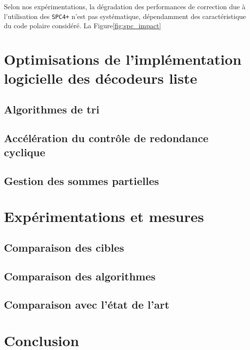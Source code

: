 Selon nos expérimentations, la dégradation des performances de correction due à l'utilisation des \noeuds \texttt{SPC4+} n'est pas systématique, dépendamment des caractéristique du code polaire considéré. La Figure\ref{fig:spc_impact}


\section{Optimisations de l'implémentation logicielle des décodeurs liste}
\label{sec:opti_scl}

\subsection{Algorithmes de tri}
\subsection{Accélération du contrôle de redondance cyclique}
\subsection{Gestion des sommes partielles}

\section{Expérimentations et mesures}
\label{sec:exp_scl}

\subsection{Comparaison des cibles}
\subsection{Comparaison des algorithmes}
\subsection{Comparaison avec l'état de l'art}
 
\section*{Conclusion}
